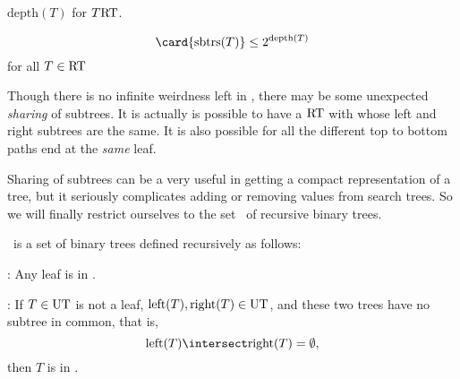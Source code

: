 \iffalse
\begin{lemma}\label{lem:finsubtrees}
Every tree in \rectree\ has only a finite number of subtrees.
\end{lemma}

\begin{proof}
The proof is by structural induction on the definition of \rectree.

\inductioncase{Base case}: If $T$ is a leaf, then $T$ has only one
subtree, namely, itself.

\inductioncase{Constructor case}: If $T \in \rectree$ is not a leaf,
then $\card{\subtrees{\leftsub{T}}}$ and $\card{\subtrees{\rightsub{T}}}$ are
finite by induction hypothesis.  Therefore
\[
\card{\subtrees{T}} \leq 1 + \card{\subtrees{\leftsub{T}}} +
\card{\subtrees{\rightsub{T}}}.
\]
\end{proof}
\fi

\begin{definition}
$\text{depth}(T)$ for $T \text{RT}$.
\end{definition}

\begin{lemma}\label{}
\[
\card{\subtrees{T}} \leq 2^{\text{depth}(T)}
\]
for all $T \in \rectree$
\end{lemma}

\iffalse
How come we have ``$\leq$'' instead of ``$=$'' in the proof of
Lemma~\ref{lem:finsubtrees}?  The answer is that the definition of
\rectree\ allows lots of sharing of subtrees.
\fi

Though there is no infinite weirdness left in \rectree, there may be
some unexpected \emph{sharing} of subtrees.  It is actually is
possible to have a $\text{RT}$ with whose left and right subtrees are
the same.  It is also possible for all the different top to bottom
paths end at the \emph{same} leaf.

Sharing of subtrees can be a very useful in getting a compact
representation of a tree, but it seriously complicates adding or
removing values from search trees.  So we will finally restrict
ourselves to the set \ubt\ of  recursive binary trees.

\begin{definition}
\ubt\ is a set of binary trees defined recursively as follows:

:  Any leaf is in \ubt.

: If $T \in \text{UT}$ is not a leaf,
$\text{left}(T), \text{right}(T) \in \text{UT}$, and these two trees
have no subtree in common, that is,
\[
\leftsub{T} \intersect \rightsub{T} = \emptyset,
\]
then $T$ is in \ubt.
\end{definition}

